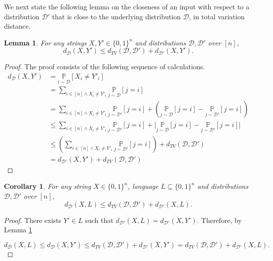 \documentclass[10pt,a4paper]{article}
\newtheorem{lemma}[theorem]{Lemma}
\newtheorem{corollary}[theorem]{Corollary}
\newcommand{\sD}{\mathcal{D}}
\begin{document}
We next state the following lemma on the closeness of an input with respect to a distribution $\sD'$ that is close to the underlying distribution $\sD$, in total variation distance.
\begin{lemma}\label{tvineq}
For any strings $X,Y' \in\{0,1\}^{n}$ and distributions $\mathcal{D}, \mathcal{D}'$ over $[n]$,
\begin{equation*}
    d_{\mathcal{D}}(X,Y')\leq d_{TV}(\mathcal{D},\mathcal{D}')+d_{\mathcal{D}'}(X,Y').
\end{equation*}
\end{lemma}

\begin{proof} The proof consists of the following sequence of calculations.
\[
\begin{split}
    d_{\mathcal{D}}(X,Y') &= \underset{i\sim\mathcal{D}}{\mathbb{P}}\left [X_{i}\neq Y'_{i}\right]\\
    &= \sum_{i\in [n]\wedge X_{i}\neq Y'_{i}}\underset{j\sim\mathcal{D}}{\mathbb{P}}\left[j=i\right]\\
    &= \sum_{i\in [n]\wedge X_{i}\neq Y'_{i}}\underset{j\sim\mathcal{D}'}{\mathbb{P}}\left[j=i\right] + \left( \underset{j\sim\mathcal{D}}{\mathbb{P}}\left[j=i\right]-\underset{j\sim\mathcal{D}'}{\mathbb{P}}\left[j=i\right] \right)\\
    &\leq \sum_{i\in [n]\wedge X_{i}\neq Y'_{i}}\underset{j\sim\mathcal{D}'}{\mathbb{P}}\left[j=i\right] +\bigg\vert\underset{j\sim\mathcal{D}}{\mathbb{P}}\left[j=i\right]-\underset{j\sim\mathcal{D}'}{\mathbb{P}}\left[j=i\right]\bigg\vert\\
    &\leq \left( \sum_{i\in [n]\wedge X_{i}\neq Y'_{i}}\underset{j\sim\mathcal{D}'}{\mathbb{P}}\left[j=i\right]\right) +d_{TV}(\mathcal{D},\mathcal{D}')\\
    &= d_{\mathcal{D}'}(X,Y')+d_{TV}(\mathcal{D},\mathcal{D}')
\end{split}
\]
\end{proof}

\begin{corollary}\label{tvineqLang}
    For any string $X \in\{0,1\}^{n}$, language $L\subseteq\{0,1\}^{n}$ and distributions $\mathcal{D}, \mathcal{D}'$ over $[n]$,
\begin{equation*}
    d_{\mathcal{D}}(X,L)\leq d_{TV}(\mathcal{D},\mathcal{D}')+d_{\mathcal{D}'}(X,L).
\end{equation*}
\end{corollary}

\begin{proof}
    There exists $Y'\in L$ such that $d_{\mathcal{D}'}(X,L)=d_{\mathcal{D}'}(X,Y')$. Therefore, by Lemma \ref{tvineq}

    \begin{equation*}
    d_{\mathcal{D}}(X,L)\leq d_{\mathcal{D}}(X,Y')\leq d_{TV}(\mathcal{D},\mathcal{D}')+d_{\mathcal{D}'}(X,Y')=d_{TV}(\mathcal{D},\mathcal{D}')+d_{\mathcal{D}'}(X,L).
\end{equation*}
\end{proof}
\end{document}
